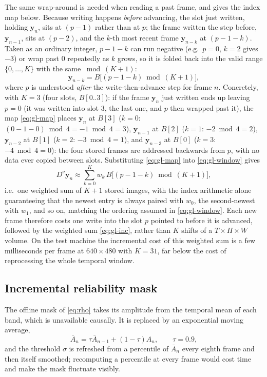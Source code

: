 \documentclass[conference]{IEEEtran}
\begin{document}
The same wrap-around is needed when reading a past frame, and gives the index
map below. Because writing happens \emph{before} advancing, the slot just
written, holding $\mathbf{y}_n$, sits at $(p-1)$ rather than at $p$; the frame
written the step before, $\mathbf{y}_{n-1}$, sits at $(p-2)$, and the $k$-th
most recent frame $\mathbf{y}_{n-k}$ at $(p-1-k)$. Taken as an ordinary
integer, $p-1-k$ can run negative (e.g.\ $p=0$, $k=2$ gives $-3$) or wrap past
$0$ repeatedly as $k$ grows, so it is folded back into the valid range
$\{0,\dots,K\}$ with the same $\bmod(K{+}1)$:
\begin{equation}
\mathbf{y}_{n-k} = B\big[(p - 1 - k) \bmod (K{+}1)\big],
\label{eq:gl-map}
\end{equation}
where $p$ is understood \emph{after} the write-then-advance step for frame
$n$. Concretely, with $K=3$ (four slots, $B[0..3]$): if the frame
$\mathbf{y}_n$ just written ends up leaving $p=0$ (it was written into
slot $3$, the last one, and $p$ then wrapped past it), the map
\eqref{eq:gl-map} places $\mathbf{y}_n$ at $B[3]$
($k{=}0$: $(0{-}1{-}0)\bmod4 = -1\bmod4 = 3$), $\mathbf{y}_{n-1}$ at $B[2]$
($k{=}1$: $-2\bmod4=2$), $\mathbf{y}_{n-2}$ at $B[1]$
($k{=}2$: $-3\bmod4=1$), and $\mathbf{y}_{n-3}$ at $B[0]$
($k{=}3$: $-4\bmod4=0$): the four stored frames are addressed backwards
from $p$, with no data ever copied between slots. Substituting \eqref{eq:gl-map} into
\eqref{eq:gl-window} gives
\begin{equation}
D^{\nu} \mathbf{y}_n \approx \sum_{k=0}^{K} w_k \, B\big[(p - 1 - k) \bmod (K{+}1)\big],
\label{eq:gl-inc}
\end{equation}
i.e.\ one weighted sum of $K+1$ stored images, with the index arithmetic
alone guaranteeing that the newest entry is always paired with $w_0$, the
second-newest with $w_1$, and so on, matching the ordering assumed in
\eqref{eq:gl-window}. Each new frame therefore costs one write into the slot
$p$ pointed to before it is advanced, followed by the weighted sum
\eqref{eq:gl-inc}, rather than $K$ shifts of a $T \times H \times W$ volume.
On the test machine the incremental cost of this weighted sum is a few
milliseconds per frame at $640\times480$ with $K=31$, far below the cost of
reprocessing the whole temporal window.

\subsection{Incremental reliability mask}

The offline mask of \eqref{eq:rho} takes its amplitude from the temporal mean of
each band, which is unavailable causally. It is replaced by an exponential
moving average,
\begin{equation}
\bar{A}_n = \tau \bar{A}_{n-1} + (1-\tau) A_n, \qquad \tau = 0.9,
\label{eq:ema}
\end{equation}
and the threshold $\sigma$ is refreshed from a percentile of $\bar{A}_n$ every
eighth frame and then itself smoothed; recomputing a percentile at every frame
would cost time and make the mask fluctuate visibly.
\end{document}
